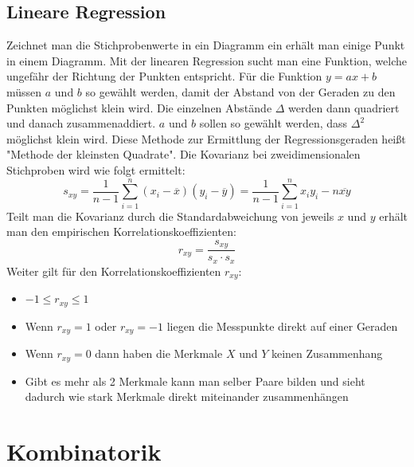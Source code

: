 \documentclass[a4paper]{scrartcl}
\begin{document}
            \subsection{Lineare Regression}
                Zeichnet man die Stichprobenwerte in ein Diagramm ein erhält man einige Punkt in einem Diagramm. Mit der linearen Regression sucht man eine Funktion, welche ungefähr
                der Richtung der Punkten entspricht. Für die Funktion \(y = ax + b\) müssen \(a\) und \(b\) so gewählt werden, damit der Abstand von der Geraden zu den Punkten möglichst klein wird.
                Die einzelnen Abstände \(\Delta \) werden dann quadriert und danach zusammenaddiert. \(a\) und \(b\) sollen so gewählt werden, dass \(\Delta ^2\) möglichst klein wird.
                Diese Methode zur Ermittlung der Regressionsgeraden heißt "Methode der kleinsten Quadrate". Die Kovarianz bei zweidimensionalen Stichproben wird wie folgt ermittelt:
                \begin{equation*}
                   s_{xy}= \frac{1}{n - 1} \sum_{i=1}^n (x_i - \overline{x})(y_i - \overline{y}) = \frac{1}{n - 1}\sum_{i=1}^n x_i y_i - n \overline{xy}
                \end{equation*}
                Teilt man die Kovarianz durch die Standardabweichung von jeweils \(x\) und \(y\) erhält man den empirischen Korrelationskoeffizienten:
                \begin{equation*}
                    r_{xy} = \frac{s_{xy}}{s_x \cdot s_x}
                \end{equation*}
                Weiter gilt für den Korrelationskoeffizienten \(r_{xy}\): 
                \begin{itemize}
                    \item \(-1 \leq r_{xy} \leq 1\)
                    \item Wenn \(r_{xy} = 1\) oder \(r_{xy} = -1\) liegen die Messpunkte direkt auf einer Geraden
                    \item Wenn \(r_{xy} = 0\) dann haben die Merkmale \(X\) und \(Y\) keinen Zusammenhang
                    \item Gibt es mehr als 2 Merkmale kann man selber Paare bilden und sieht dadurch wie stark Merkmale direkt miteinander zusammenhängen 
                \end{itemize} 

    \section{Kombinatorik}
\end{document}
